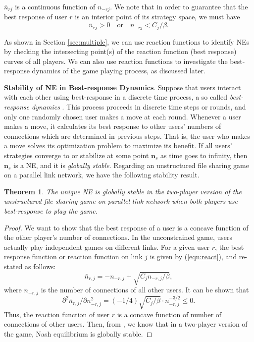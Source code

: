 \documentclass[conference]{IEEEtran}
\newtheorem{theorem}{Theorem}
\begin{document}
$\bar{n}_{rj}$ is a continuous function of $n_{-rj}$. We note that
in order to guarantee that the best response of user $r$ is an
interior point of its strategy space, we must have
\begin{equation}
\bar{n}_{rj} > 0 \quad \mbox{or} \quad n_{-rj} < C_j /\beta.
\end{equation}


As shown in Section \ref{sec:multiple}, we can use reaction
functions to identify NEs by checking the intersecting point(s) of
the reaction function (best response) curves of all players. We
can also use reaction functions to investigate the best-response
dynamics of the game playing process, as discussed later.

\bigskip
\noindent \textbf{Stability of NE in Best-response Dynamics}.
Suppose that users interact with each other using best-response in
a discrete time process, a so called \textit{best-response
dynamics} \cite{basar98game}\cite{zhang05tcpgame_icnp}. This
process proceeds in discrete time steps or rounds, and only one
randomly chosen user makes a move at each round.
Whenever a user makes a move, it calculates its best response to
other users' numbers of connections which are determined in
previous steps. That is, the user who makes a move solves its
optimization problem to maximize its benefit. If all users'
strategies converge to or stabilize at some point $\mathbf{n}_s$
as time goes to infinity, then $\mathbf{n}_s$ is a NE, and it is
\textit{globally stable}. Regarding an unstructured file sharing
game on a parallel link network, we have the following stability
result.


\begin{theorem}
The unique NE is globally stable in the two-player version of the
unstructured file sharing game on parallel link network when both
players use best-response to play the game.
\end{theorem}
\begin{proof}
We want to show that the best response of a user is a concave
function of the other player's number of connections. In the
unconstrained game, users actually play independent games on
different links. For a given user $r$, the best response function
or reaction function on link $j$ is given by (\ref{eqn:react}),
and re-stated as follows:
$$
\bar{n}_{r,j}=-n_{-r,j} + \sqrt{C_j n_{-r,j}/\beta},
$$
where $n_{-r,j}$ is the number of connections of all other users.
It can be shown that
$$
\partial^2 \bar{n}_{r,j}/\partial n_{-r,j}^2 = (-1/4)\sqrt{C_j/\beta} \cdot n_{-r,j}^{-3/2} \le 0.
$$
Thus, the reaction function of user $r$ is a concave function of
number of connections of other users. Then, from
\cite{zhang05tcpgame_tech}, we know that in a two-player version
of the game, Nash equilibrium is globally stable.
\end{proof}
\end{document}
